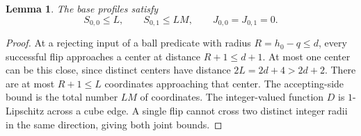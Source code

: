 \documentclass[11pt]{article}
\newtheorem{lemma}[theorem]{Lemma}
\theoremstyle{definition}
\begin{document}
\begin{lemma}\label{lem:baseprofiles}
The base profiles satisfy
\[
 S_{0,0}\le L,\qquad S_{0,1}\le LM,\qquad J_{0,0}=J_{0,1}=0.
\]
\end{lemma}
\begin{proof}
At a rejecting input of a ball predicate with radius $R=h_0-q\le d$, every successful flip approaches a center at distance $R+1\le d+1$. At most one center can be this close, since distinct centers have distance $2L=2d+4>2d+2$. There are at most $R+1\le L$ coordinates approaching that center. The accepting-side bound is the total number $LM$ of coordinates. The integer-valued function $D$ is $1$-Lipschitz across a cube edge. A single flip cannot cross two distinct integer radii in the same direction, giving both joint bounds.
\end{proof}
\end{document}
